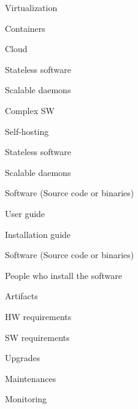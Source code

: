 \titleSlide


\begin{iframe}[Welcome in 2015]
\item Virtualization
\item Containers
\item Cloud
\item Stateless software
\item Scalable daemons
\end{iframe}

\begin{iframe}
\item Complex SW
\item Self-hosting
\item Stateless software
\item Scalable daemons
\end{iframe}

\begin{iframe}
\item Software (Source code or binaries)
\item User guide
\item Installation guide
\end{iframe}

\begin{iframe}
\item Software (Source code or binaries)
\item People who install the software
\end{iframe}

\begin{iframe}
\item Artifacts
\item HW requirements
\item SW requirements
\item Upgrades
\item Maintenances
\item Monitoring
\end{iframe}

\thankyouSlide
\renewcommand{\insertLogo}{}
\contactSlide

